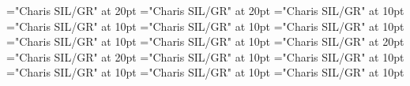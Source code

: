 \documentclass[a4paper]{article}
\begin{document}
\pagestyle{plain}
\sloppy
\setlength{\parfillskip}{0pt plus 1fil}
\font\pronunciationenUKpronunciationbefore="Charis SIL/GR" at 20pt
\font\pronunciationenUSpronunciationbefore="Charis SIL/GR" at 20pt
\font\sectionletterdictionary="Charis SIL/GR" at 10pt
\font\headsectionletterdictionary="Charis SIL/GR" at 10pt
\font\articledictionary="Charis SIL/GR" at 10pt
\font\headwordfirstoftypearticledictionary="Charis SIL/GR" at 10pt
\font\grammarrequiresfirstoftypearticledictionary="Charis SIL/GR" at 10pt
\font\relationsynonymfirstoftypearticledictionary="Charis SIL/GR" at 10pt
\font\pronunciationenUKarticledictionary="Charis SIL/GR" at 20pt
\font\pronunciationenUSarticledictionary="Charis SIL/GR" at 20pt
\font\grammarcategoryfirstoftypearticledictionary="Charis SIL/GR" at 10pt
\font{}="Charis SIL/GR" at 10pt
\font\notefirstoftypearticledictionary="Charis SIL/GR" at 10pt
\font\exampleusearticledictionary="Charis SIL/GR" at 10pt
\font\examplearticledictionary="Charis SIL/GR" at 10pt

\mbox{} 
\newpage 
\newpage 
\setcounter{page}{1} 
\pagestyle{fancy} 


\end{document}
